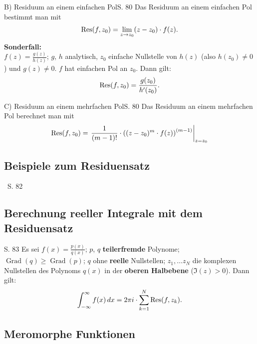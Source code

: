 \begin{bemerkung}{B) Residuum an einem einfachen Pol}{S. 80}
  Das Residuum an einem einfachen Pol bestimmt man mit
  \begin{align}
    \operatorname{Res}(f, z_0) = \lim_{z \to z_0} (z-z_0) \cdot f(z) .
  \end{align}
  \textbf{Sonderfall:}\\
  $f(z) = \frac{g(z)}{h(z)}$; $g$, $h$ analytisch, $z_0$ einfache Nullstelle von $h(z)$ (also $h(z_0) \neq 0$) und $g(z) \neq 0$.
  $f$ hat einfachen Pol an $z_0$.
  Dann gilt:
  \begin{align}
    \operatorname{Res}(f, z_0) = \frac{g(z_0)}{h'(z_0)} .
  \end{align}
\end{bemerkung}

\begin{bemerkung}{C) Residuum an einem mehrfachen Pol}{S. 80}
  Das Residuum an einem mehrfachen Pol berechnet man mit
  \begin{align}
    \operatorname{Res}(f, z_0) = \left. \frac{1}{(m-1)!} \cdot \left( (z-z_0)^m \cdot f(z) \right)^{(m-1)} \right\vert_{z=z_0}
  \end{align}
\end{bemerkung}



\subsection{Beispiele zum Residuensatz}
\ S. 82



\subsection{Berechnung reeller Integrale mit dem Residuensatz}

\begin{satz}[]{S. 83}
  \label{satz:8_2}
  Es sei $f(x) = \frac{p(x)}{q(x)}$; $p$, $q$ \textbf{teilerfremde} Polynome; $\operatorname{Grad}(q) \geq \operatorname{Grad}(p)$; $q$ ohne \textbf{reelle} Nullstellen; $z_1, \dots z_N$ die komplexen Nullstellen des Polynoms $q(x)$ in der \textbf{oberen Halbebene} ($\Im(z)>0$).
  Dann gilt:
  \begin{align}
    \int_{-\infty}^{\infty} f(x) \, dx = 2 \pi i \cdot \sum_{k=1}^N \operatorname{Res}(f, z_k) .
  \end{align}
\end{satz}



\subsection{Meromorphe Funktionen}

